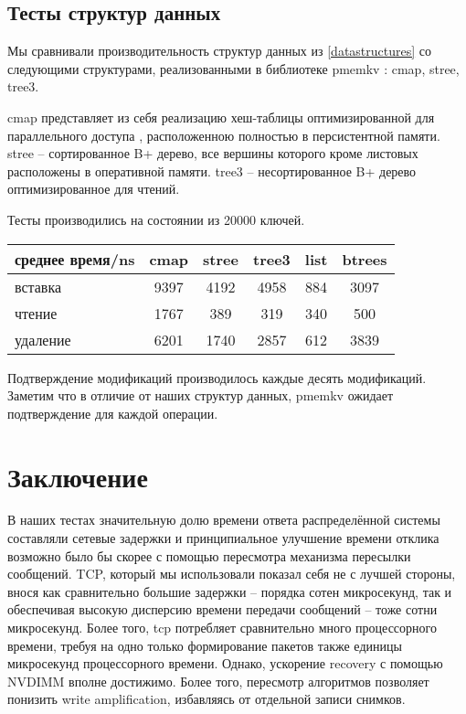 \documentclass[pdftex,ptm,12pt,a4paper]{report}
\theoremstyle{definition}
\begin{document}
\section{Тесты структур данных}
\label{pmemkvtests}

Мы сравнивали производительность структур данных из \ref{datastructures} со следующими структурами, реализованными в
библиотеке pmemkv \cite{pmemkv}: cmap, stree, tree3.

cmap представляет из себя реализацию хеш-таблицы оптимизированной для параллельного доступа \cite{malakhov2015perbucket}, расположенною полностью в персистентной памяти.
stree -- сортированное B+ дерево, все вершины которого кроме листовых расположены в оперативной памяти.
tree3 -- несортированное B+ дерево оптимизированное для чтений.

Тесты производились на состоянии из 20000 ключей.

\begin{center}
\begin{tabular} {|l| c c c c c|}
\hline
среднее время/ns & cmap & stree & tree3 & list & btrees \\
\hline
вставка & 9397 & 4192 & 4958 & 884 & 3097 \\
чтение & 1767 & 389 & 319 & 340 & 500 \\
удаление & 6201 & 1740 & 2857 & 612 & 3839 \\
\hline
\end{tabular}
\end{center}

Подтверждение модификаций производилось каждые десять модификаций. Заметим что в отличие от наших структур данных, pmemkv ожидает подтверждение для каждой операции.

\chapter{Заключение}
В наших тестах значительную долю времени ответа распределённой системы составляли сетевые задержки и принципиальное улучшение времени отклика возможно было бы скорее с помощью
пересмотра механизма пересылки сообщений. TCP, который мы использовали показал себя не с лучшей стороны, внося как сравнительно большие задержки -- порядка сотен микросекунд, так
и обеспечивая высокую дисперсию времени передачи сообщений -- тоже сотни микросекунд. Более того, tcp потребляет сравнительно много процессорного времени, требуя на одно только
формирование пакетов также единицы микросекунд процессорного времени. Однако, ускорение recovery с помощью NVDIMM вполне достижимо. Более того, 
пересмотр алгоритмов позволяет понизить write amplification, избавляясь от отдельной записи снимков.




\end{document}
